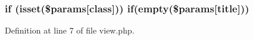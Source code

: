 \subsubsection[{\texorpdfstring{if}{if}}]{\setlength{\rightskip}{0pt plus 5cm}if (isset(\$params\mbox{[}\textquotesingle{}class\textquotesingle{}\mbox{]})) if(empty(\$params\mbox{[}\textquotesingle{}title\textquotesingle{}\mbox{]}))}\hypertarget{themes_2goblue_2plugins_2default_2widget_2view_8php_a29158bf47ab232dfbfaf5bc7a931d4ae}{}\label{themes_2goblue_2plugins_2default_2widget_2view_8php_a29158bf47ab232dfbfaf5bc7a931d4ae}


Definition at line 7 of file view.\+php.

